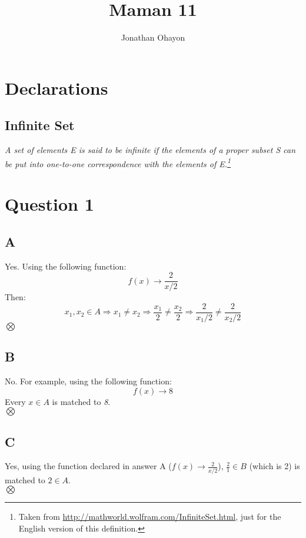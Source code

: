 \documentclass[12pt, oneside]{article}
\title{Maman 11}
\author{Jonathan Ohayon}
\begin{document}
\maketitle
\setcounter{section}{-1}

\section{Declarations}
\subsection{Infinite Set}
\begin{center}
\emph{A set of elements E is said to be infinite if the elements of a proper subset S can be put into one-to-one correspondence with the elements of E.\footnote{Taken from \url{http://mathworld.wolfram.com/InfiniteSet.html}, just for the English version of this definition.}}
\end{center}

\section{Question 1}
\subsection{A}
Yes. Using the following function:
\begin{equation*}
f(x) \rightarrow \frac{2}{x/2}
\end{equation*}
Then:
\begin{equation*}
x_1, x_2 \in A \Rightarrow
x_1 \neq x_2 \Rightarrow
\frac{x_1}{2} \neq \frac{x_2}{2} \Rightarrow
\frac{2}{x_1/2} \neq \frac{2}{x_2/2}
\end{equation*}
$\bigotimes$
\clearpage

\subsection{B}
No. For example, using the following function:
\begin{equation*}
f(x) \rightarrow 8
\end{equation*}
Every $x \in A$ is matched to \emph{8}.\\
$\bigotimes$

\subsection{C}
Yes, using the function declared in answer A ($f(x) \rightarrow \frac{2}{x/2}$), $\frac{2}{1} \in B$ (which is 2) is matched to $2 \in A$.\\
$\bigotimes$
\end{document}
